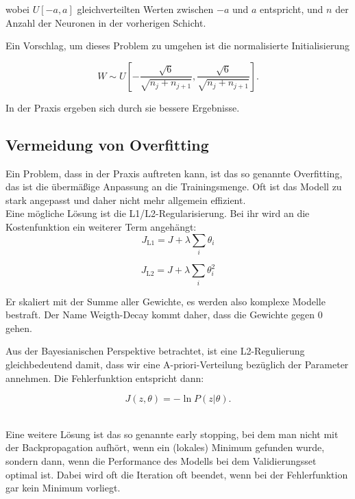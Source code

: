 wobei $U[-a, a]$ gleichverteilten Werten zwischen $-a$ und $a$ entspricht, und $n$ der Anzahl der Neuronen in der vorherigen Schicht. 

Ein Vorschlag, um dieses Problem zu umgehen ist die normalisierte Initialisierung

\begin{equation}
	W \sim U [ - \frac{\sqrt{6}}{\sqrt{n_j+n_{j+1}}} 
	, 			 \frac{\sqrt{6}}{\sqrt{n_j+n_{j+1}}} ]. 
\end{equation}

In der Praxis ergeben sich durch sie bessere Ergebnisse. \cite{glorot2010understanding}

\subsection{Vermeidung von Overfitting}
Ein Problem, dass in der Praxis auftreten kann, ist das so genannte Overfitting, das ist die übermäßige Anpassung an die Trainingsmenge. Oft ist das Modell zu stark angepasst und daher nicht mehr allgemein effizient.\\

Eine mögliche Lösung ist die L1/L2-Regularisierung. Bei ihr wird an die Kostenfunktion ein weiterer Term angehängt:\\

\begin{equation}
	J_{\text{L1}} = J + \lambda \sum_i \theta_i 
\end{equation}

\begin{equation}
	J_{\text{L2}} = J + \lambda \sum_i \theta_i^2
\end{equation}


Er skaliert mit der Summe aller Gewichte, es werden also komplexe Modelle bestraft. Der Name Weigth-Decay kommt daher, dass die Gewichte gegen 0 gehen. \cite{Hastie2009}

Aus der Bayesianischen Perspektive betrachtet, ist eine L2-Regulierung gleichbedeutend damit, dass wir eine A-priori-Verteilung bezüglich der Parameter annehmen. Die Fehlerfunktion entspricht dann:

\begin{equation}
	J(z, \theta) = - \ln P (z | \theta).
\end{equation}

\cite{bengio2012practical} \\
Eine weitere Lösung ist das so genannte early stopping, bei dem man nicht mit der Backpropagation aufhört, wenn ein (lokales) Minimum gefunden wurde, sondern dann, wenn die Performance des Modells bei dem Validierungsset optimal ist. Dabei wird oft die Iteration oft beendet, wenn bei der Fehlerfunktion gar kein Minimum vorliegt.  \cite{bishop1995neural}

